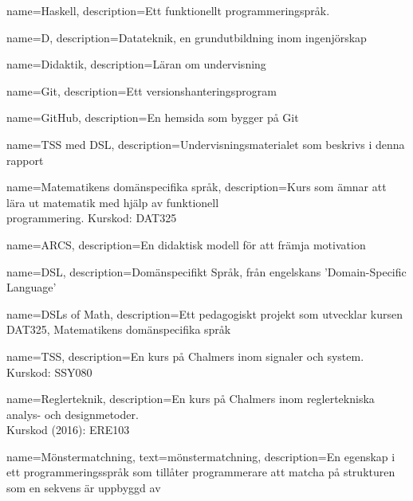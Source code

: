 
{
    name=Haskell,
    description={Ett funktionellt programmeringspråk.}
}

{
    name=D,
    description={Datateknik, en grundutbildning inom ingenjörskap}
}

{
    name=Didaktik,
    description={Läran om undervisning}
}

{
    name=Git,
    description={Ett versionshanteringsprogram}
}

{
    name=GitHub,
    description={En hemsida som bygger på Git}
}

{
    name={TSS med DSL},
    description={Undervisningsmaterialet som beskrivs i denna rapport}
}

{
    name={Matematikens domänspecifika språk},
    description={Kurs som ämnar att lära ut matematik med hjälp av funktionell\\
    programmering. Kurskod: DAT325}
}

{
    name=ARCS,
    description={En didaktisk modell för att främja motivation}
}

{
    name=DSL,
    description={Domänspecifikt Språk, från engelskans 'Domain-Specific
    Language'}
}

{
    name={DSLs of Math},
    description={Ett pedagogiskt projekt som utvecklar kursen DAT325,
    Matematikens domänspecifika språk}
}

{
    name={TSS},
    description={En kurs på Chalmers inom signaler och system.\\
    Kurskod: SSY080}
}

{
    name={Reglerteknik},
    description={En kurs på Chalmers inom reglertekniska analys- och
    designmetoder.\\
    Kurskod (2016): ERE103}
}

{
    name={Mönstermatchning},
    text={mönstermatchning},
    description={En egenskap i ett programmeringsspråk som tillåter
    programmerare att matcha på strukturen som en sekvens är uppbyggd av}
}






